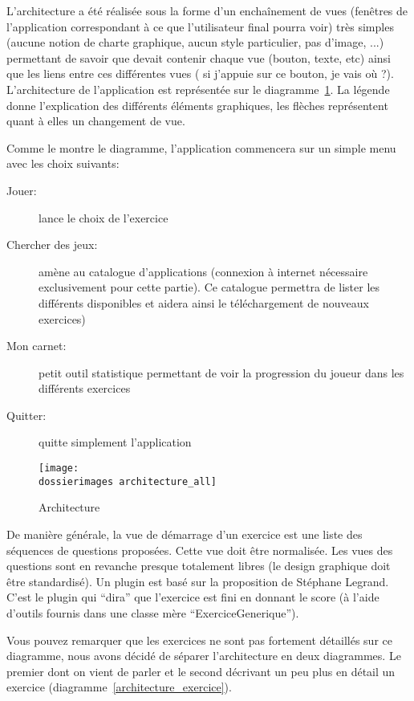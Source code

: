L'architecture a été réalisée sous la forme d'un enchaînement de vues (fenêtres de l'application correspondant à ce que l'utilisateur final pourra voir) très simples (aucune notion de charte graphique, aucun style particulier, pas d'image, ...) permettant de savoir que devait contenir chaque vue (bouton, texte, etc) ainsi que les liens entre ces différentes vues (\og{} si j'appuie sur ce bouton, je vais où ?\fg{}).
\newline
L'architecture de l'application est représentée sur le diagramme~\ref{architecture_all}. La légende donne l'explication des différents éléments graphiques, les flèches représentent quant à elles un changement de vue.

Comme le montre le diagramme, l'application commencera sur un simple menu avec les choix suivants:
\begin{description}
\item[Jouer:] lance le choix de l'exercice
\item[Chercher des jeux:] amène au catalogue d'applications (connexion à internet nécessaire exclusivement pour cette partie). Ce catalogue permettra de lister les différents \plugins{} disponibles et aidera ainsi le téléchargement de nouveaux exercices)
\item[Mon carnet:] petit outil statistique permettant de voir la progression du joueur dans les différents exercices
\item[Quitter:] quitte simplement l'application
\end{description}

\begin{figure}[htp]
	\centering
	\texttt{[image: \\dossierimages architecture\_all]}
	\caption{Architecture}
	\label{architecture_all}
\end{figure}De manière générale, la vue de démarrage d’un exercice est une liste des séquences de questions proposées. Cette vue doit être normalisée. Les vues des questions sont en revanche presque totalement libres (le design graphique doit être standardisé). Un plugin est basé sur la proposition de Stéphane Legrand. C’est le plugin qui “dira” que l’exercice est fini en donnant le score (à l’aide d’outils fournis dans une classe mère “ExerciceGenerique”).

Vous pouvez remarquer que les exercices ne sont pas fortement détaillés sur ce diagramme, nous avons décidé de séparer l'architecture en deux diagrammes. Le premier dont on vient de parler et le second décrivant un peu plus en détail un exercice (diagramme~\ref{architecture_exercice}).

